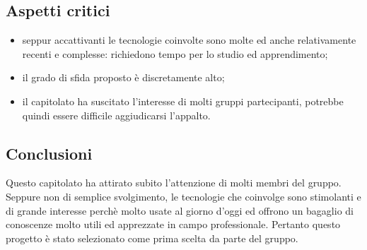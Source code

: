 \subsection{Aspetti critici}
\begin{itemize}
\item seppur accattivanti le tecnologie coinvolte sono molte ed anche relativamente recenti e complesse: richiedono tempo per lo studio ed apprendimento;
\item il grado di sfida proposto è discretamente alto;
\item il capitolato ha suscitato l'interesse di molti gruppi partecipanti, potrebbe quindi essere difficile aggiudicarsi l'appalto.
\end{itemize}

\subsection{Conclusioni}
Questo capitolato ha attirato subito l'attenzione di molti membri del gruppo. Seppure non di semplice svolgimento, le tecnologie che coinvolge sono stimolanti e di grande interesse perchè molto usate al giorno d'oggi ed offrono un bagaglio di conoscenze molto utili ed apprezzate in campo professionale. Pertanto questo progetto è stato selezionato come prima scelta da parte del gruppo.
